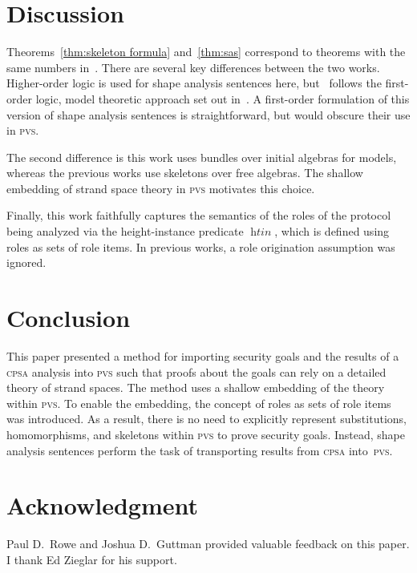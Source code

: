 \documentclass[titlepage,12pt]{article}
\newcommand{\cpsa}{\textsc{cpsa}}
\newcommand{\pvs}{\textsc{pvs}}
\newcommand{\fn}[1]{\ensuremath{\operatorname{\mathit{#1}}}}
\begin{document}
\section{Discussion}\label{sec:discussion}

Theorems~\ref{thm:skeleton formula} and~\ref{thm:sas} correspond to
theorems with the same numbers in~\cite{Ramsdell12}.  There are
several key differences between the two works.  Higher-order logic is
used for shape analysis sentences here, but~\cite{Ramsdell12} follows
the first-order logic, model theoretic approach set out
in~\cite{Guttman09}.  A first-order formulation of this version of
shape analysis sentences is straightforward, but would obscure their
use in {\pvs}.

The second difference is this work uses bundles over initial algebras
for models, whereas the previous works use skeletons over free
algebras.  The shallow embedding of strand space theory in {\pvs}
motivates this choice.

Finally, this work faithfully captures the semantics of the roles of
the protocol being analyzed via the height-instance predicate
\fn{htin}, which is defined using roles as sets of role items.  In
previous works, a role origination assumption was ignored.

\section{Conclusion}\label{sec:conclusion}

This paper presented a method for importing security goals and the
results of a {\cpsa} analysis into {\pvs} such that proofs about the
goals can rely on a detailed theory of strand spaces.  The method uses
a shallow embedding of the theory within {\pvs}.  To enable the
embedding, the concept of roles as sets of role items was introduced.
As a result, there is no need to explicitly represent substitutions,
homomorphisms, and skeletons within {\pvs} to prove security goals.
Instead, shape analysis sentences perform the task of transporting
results from {\cpsa} into~{\pvs}.

\section*{Acknowledgment}

Paul D.\ Rowe and Joshua D.\ Guttman provided valuable feedback on
this paper.  I thank Ed Zieglar for his support.



\end{document}
